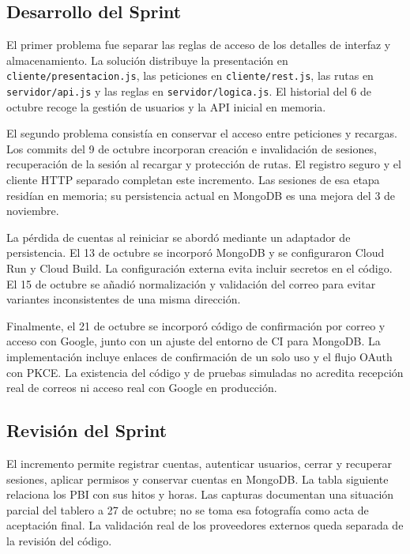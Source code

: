 \subsection{Desarrollo del Sprint}
El primer problema fue separar las reglas de acceso de los detalles de interfaz y almacenamiento. La solución distribuye la presentación en \texttt{cliente/presentacion.js}, las peticiones en \texttt{cliente/rest.js}, las rutas en \texttt{servidor/api.js} y las reglas en \texttt{servidor/logica.js}. El historial del 6 de octubre recoge la gestión de usuarios y la API inicial en memoria.

El segundo problema consistía en conservar el acceso entre peticiones y recargas. Los commits del 9 de octubre incorporan creación e invalidación de sesiones, recuperación de la sesión al recargar y protección de rutas. El registro seguro y el cliente HTTP separado completan este incremento. Las sesiones de esa etapa residían en memoria; su persistencia actual en MongoDB es una mejora del 3 de noviembre.

La pérdida de cuentas al reiniciar se abordó mediante un adaptador de persistencia. El 13 de octubre se incorporó MongoDB y se configuraron Cloud Run y Cloud Build. La configuración externa evita incluir secretos en el código. El 15 de octubre se añadió normalización y validación del correo para evitar variantes inconsistentes de una misma dirección.

Finalmente, el 21 de octubre se incorporó código de confirmación por correo y acceso con Google, junto con un ajuste del entorno de CI para MongoDB. La implementación incluye enlaces de confirmación de un solo uso y el flujo OAuth con PKCE. La existencia del código y de pruebas simuladas no acredita recepción real de correos ni acceso real con Google en producción.

\subsection{Revisión del Sprint}
El incremento permite registrar cuentas, autenticar usuarios, cerrar y recuperar sesiones, aplicar permisos y conservar cuentas en MongoDB. La tabla siguiente relaciona los PBI con sus hitos y horas. Las capturas documentan una situación parcial del tablero a 27 de octubre; no se toma esa fotografía como acta de aceptación final. La validación real de los proveedores externos queda separada de la revisión del código.

